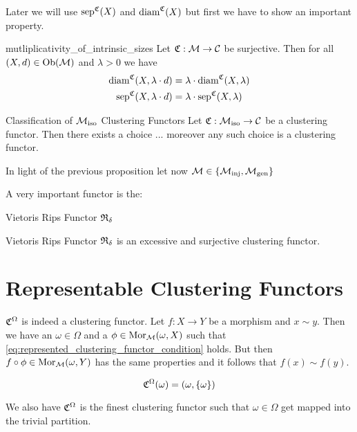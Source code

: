 Later we will use $\mathrm{sep}^{\mathfrak{C}}(X)$ and $\mathrm{diam}^{\mathfrak{C}}(X)$ but first we have to show an important property.

\begin{lemma}{}{mutliplicativity_of_intrinsic_sizes}
Let $\mathfrak{C}: \mathcal{M} \to \mathcal{C}$ be surjective. Then for all $(X,d) \in \mathrm {Ob}(\mathcal{M})$ and $\lambda > 0$ we have
\begin{align*}{}{}
    \mathrm{diam}^{\mathfrak{C}}(X,\lambda \cdot d) &= \lambda \cdot \mathrm{diam}^{\mathfrak{C}}(X,\lambda) \\
    \mathrm{sep}^{\mathfrak{C}}(X,\lambda \cdot d) &= \lambda \cdot \mathrm{sep}^{\mathfrak{C}}(X,\lambda)
\end{align*}
\end{lemma}

\begin{proposition}{Classification of ${\mathcal{M}_\mathrm{iso}}$ Clustering Functors}{}
Let $\mathfrak{C}: {\mathcal{M}_\mathrm{iso}} \to \mathcal{C}$ be a clustering functor. Then there exists a choice ... moreover any such choice is a clustering functor.
\end{proposition}
In light of the previous proposition let now $\mathcal{M} \in \{{\mathcal{M}_\mathrm{inj}}, {\mathcal{M}_\mathrm{gen}}\}$


A very important functor is the:
\begin{definition}{Vietoris Rips Functor}{}
$\mathfrak{R}_\delta$
\end{definition}




\begin{proposition}{Vietoris Rips Functor}{}
$\mathfrak{R}_\delta$ is an excessive and surjective clustering functor.
\end{proposition}

\section{Representable Clustering Functors}


$\mathfrak{C}^\Omega$ is indeed a clustering functor. Let $f: X \to Y$ be a morphism and $x \sim y$. Then we have an $\omega \in \Omega$ and a $\phi \in \mathrm {Mor}_{\mathcal{M}}(\omega, X)$ such that \eqref{eq:represented_clustering_functor_condition} holds. But then $f \circ \phi \in \mathrm {Mor}_{\mathcal{M}}(\omega,Y)$ has the same properties and it follows that $f(x) \sim f(y)$.

\begin{myremark}{}{}

$$
\mathfrak{C}^\Omega(\omega) = (\omega, \{\omega\})
$$

We also have $\mathfrak{C}^\Omega$ is the finest clustering functor such that $\omega \in \Omega$ get mapped into the trivial partition.
\end{myremark}

